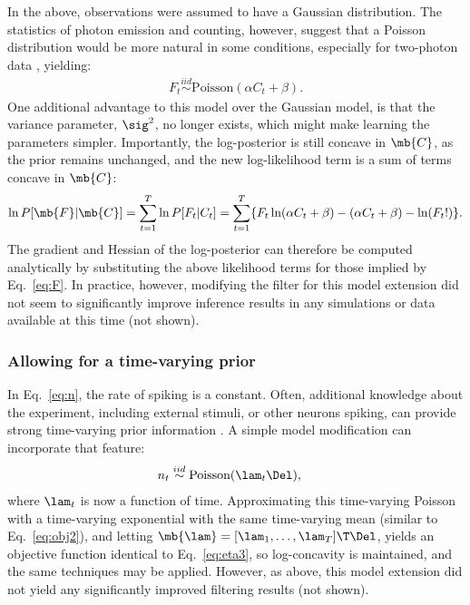 In the above, observations were assumed to have a Gaussian distribution.  The statistics of photon emission and counting, however, suggest that a Poisson distribution would be more natural in some conditions, especially for two-photon data \cite{SjulsonMiesenbock07}, yielding:
\begin{align} \label{eq:poiss}
	F_t \overset{iid}{\sim}\text{Poisson}(\alpha C_t + \beta).
\end{align}
One additional advantage to this model over the Gaussian model, is that the variance parameter, $\sig^2$, no longer exists, which might make learning the parameters simpler.  Importantly, the log-posterior is still concave in $\mb{C}$, as
the prior remains unchanged, and the new log-likelihood term is a sum of terms concave in $\mb{C}$:
\begin{align}
	\ln P[\mb{F} | \mb{C}] = \sum_{t=1}^T \ln P[F_t | C_t ] = \sum_{t=1}^T \{F_t \ln (\alpha C_t + \beta) -(\alpha C_t + \beta) - \ln(F_t !)\}.
\end{align}
The gradient and Hessian of the log-posterior can therefore be computed analytically by substituting the above likelihood terms for those implied by Eq.~\eqref{eq:F}.  In practice, however, modifying the filter for this model extension did not seem to significantly improve inference results in any simulations or data available at this time (not shown).

\subsubsection{Allowing for a time-varying prior}

In Eq.~\eqref{eq:n}, the rate of spiking is a constant.  Often, additional knowledge about the experiment, including external stimuli, or other neurons spiking, can provide strong time-varying prior information \cite{VogelsteinPaninski09}.  A simple model modification can incorporate that feature:
\begin{align}
	n_t &\overset{iid}{\sim} \text{Poisson}(\lam_t \Del),
\end{align}
where $\lam_t$ is now a function of time.  Approximating this time-varying Poisson with a time-varying exponential with the same time-varying mean (similar to Eq.~\eqref{eq:obj2}), and letting $\mb{\lam} = [\lam_1, \ldots, \lam_T]\T \Del$, yields an objective function identical to Eq.~\eqref{eq:eta3}, so log-concavity is maintained, and the same techniques may be applied.  However, as above, this model extension did not yield any significantly improved filtering results (not shown).

